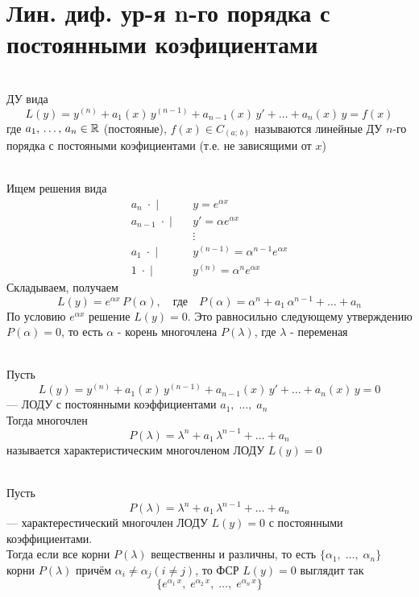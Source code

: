 \section{Лин. диф. ур-я n-го порядка с постоянными коэфициентами}

\begin{Def}~\\
    ДУ вида
    \[
        L(y)=y^{(n)}+a_1(x)\,y^{(n-1)}+a_{n-1}(x)\,y'+\dots+a_n(x)\,y=f(x)
    \]
    где $a_1,\, \dots,\, a_n \in \mathbb{R}$ (постояные), $f(x)\in C_{(a;\,b)}$ называются линейные ДУ $n$-го порядка с постояными коэфициентами (т.е. не зависящими от $x$)
\end{Def}

\begin{Note} [Основа метода реш. ДУ $L(y)=0$]~\\
    Ищем решения вида
    \begin{align*}
        a_n\; \cdot \; | \quad &y=e^{\alpha x} \\
        a_{n-1}\; \cdot \; | \quad &y'=\alpha e^{\alpha x} \\
         &\vdots\\
        a_1\; \cdot \; | \quad &y^{(n-1)}=\alpha^{n-1} e^{\alpha x} \\
        1\; \cdot \; | \quad &y^{(n)}=\alpha^{n} e^{\alpha x}
    \end{align*}
    Складываем, получаем
    \[
        L(y)=e^{\alpha x}\,P(\alpha), \quad \text{где} \quad P(\alpha)=\alpha^n+a_1\,\alpha^{n-1}+\dots+a_n
    \]
    По условию $e^{\alpha x}$ решение $L(y)=0$. Это равносильно следующему утверждению $P(\alpha) = 0$, то есть $\alpha$ - корень многочлена $P(\lambda)$, где $\lambda$ - переменая
\end{Note}

\begin{Def}~\\
    Пусть
    \[
        L(y)=y^{(n)}+a_1(x)\,y^{(n-1)}+a_{n-1}(x)\,y'+\dots+a_n(x)\,y=0
    \] 
    --- ЛОДУ с постоянными коэффициентами $a_1,\; \dots,\; a_n$\\
    Тогда многочлен 
    \[
        P(\lambda) = \lambda^n+a_1\,\lambda^{n-1}+\dots+a_n
    \] 
    называется характеристическим многочленом ЛОДУ $L(y)=0$\\
\end{Def}

\begin{Th}~\\
    Пусть
    \[
        P(\lambda) = \lambda^n+a_1\,\lambda^{n-1}+\dots+a_n
    \]
    --- характерестический многочлен ЛОДУ $L(y)=0$ с постоянными коэффициентами.\\
    Тогда если все корни $P(\lambda)$ вещественны и различны, то есть $\{\alpha_1,\; \dots,\; \alpha_n\}$ корни $P(\lambda)$ причём $\alpha_i \neq \alpha_j (i \neq j)$, то ФСР $L(y)=0$ выглядит так
    \[
        \{e^{\alpha_1\,x},\; e^{\alpha_2\,x},\; \dots,\; e^{\alpha_n\,x}\}
    \]
\end{Th}

